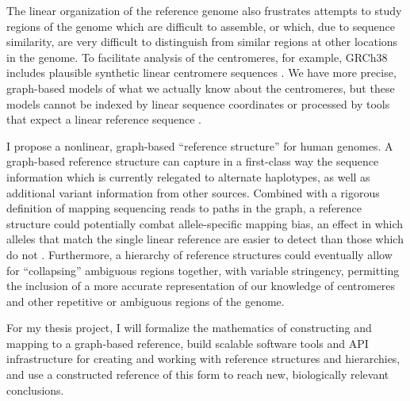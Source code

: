 \documentclass[11pt,proposal]{ucthesis}
\begin{document}

The linear organization of the reference genome also frustrates attempts to study regions of the genome which are difficult to assemble, or which, due to sequence similarity, are very difficult to distinguish from similar regions at other locations in the genome. To facilitate analysis of the centromeres, for example, GRCh38 includes plausible synthetic linear centromere sequences \cite{karolchik2014new}. We have more precise, graph-based models of what we actually know about the centromeres, but these models cannot be indexed by linear sequence coordinates or processed by tools that expect a linear reference sequence \cite{miga2014centromere}.

I propose a nonlinear, graph-based ``reference structure'' for human genomes. A graph-based reference structure can capture in a first-class way the sequence information which is currently relegated to alternate haplotypes, as well as additional variant information from other sources. Combined with a rigorous definition of mapping sequencing reads to paths in the graph, a reference structure could potentially combat allele-specific mapping bias, an effect in which alleles that match the single linear reference are easier to detect than those which do not \cite{degner2009effect}. Furthermore, a hierarchy of reference structures could eventually allow for ``collapsing'' ambiguous regions together, with variable stringency, permitting the inclusion of a more accurate representation of our knowledge of centromeres and other repetitive or ambiguous regions of the genome.

For my thesis project, I will formalize the mathematics of constructing and mapping to a graph-based reference, build scalable software tools and API infrastructure for creating and working with reference structures and hierarchies, and use a constructed reference of this form to reach new, biologically relevant conclusions.


    
    
    

    
\end{document}

